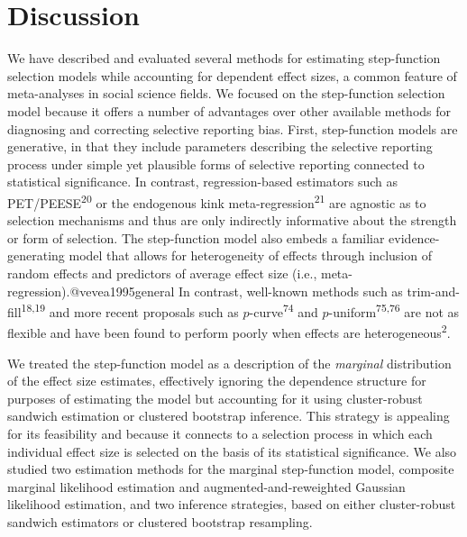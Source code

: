 \documentclass[
  american,
  man, donotrepeattitle,floatsintext]{apa7}
\begin{document}
\section{Discussion}\label{discussion}

We have described and evaluated several methods for estimating step-function selection models while accounting for dependent effect sizes, a common feature of meta-analyses in social science fields.
We focused on the step-function selection model because it offers a number of advantages over other available methods for diagnosing and correcting selective reporting bias.
First, step-function models are generative, in that they include parameters describing the selective reporting process under simple yet plausible forms of selective reporting connected to statistical significance.
In contrast, regression-based estimators such as PET/PEESE\textsuperscript{20} or the endogenous kink meta-regression\textsuperscript{21} are agnostic as to selection mechanisms and thus are only indirectly informative about the strength or form of selection.
The step-function model also embeds a familiar evidence-generating model that allows for heterogeneity of effects through inclusion of random effects and predictors of average effect size (i.e., meta-regression).@vevea1995general
In contrast, well-known methods such as trim-and-fill\textsuperscript{18,19} and more recent proposals such as \(p\)-curve\textsuperscript{74} and \(p\)-uniform\textsuperscript{75,76} are not as flexible and have been found to perform poorly when effects are heterogeneous\textsuperscript{2}.

We treated the step-function model as a description of the \emph{marginal} distribution of the effect size estimates, effectively ignoring the dependence structure for purposes of estimating the model but accounting for it using cluster-robust sandwich estimation or clustered bootstrap inference.
This strategy is appealing for its feasibility and because it connects to a selection process in which each individual effect size is selected on the basis of its statistical significance.
We also studied two estimation methods for the marginal step-function model, composite marginal likelihood estimation and augmented-and-reweighted Gaussian likelihood estimation, and two inference strategies, based on either cluster-robust sandwich estimators or clustered bootstrap resampling.
\end{document}
